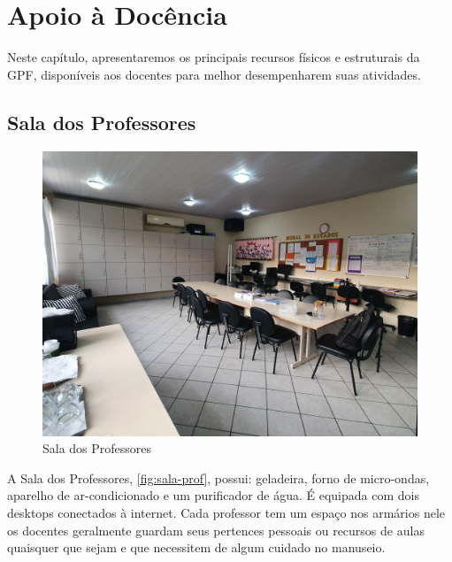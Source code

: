 \chapter{Apoio à Docência} %
\label{chap:Apoio à Docência}
Neste capítulo, apresentaremos os principais recursos físicos e estruturais da \ac{GPF}, disponíveis aos docentes para melhor desempenharem suas atividades.

\section{Sala dos Professores} %
\label{sec:Sala dos Professores}
\setlength\intextsep{0pt}
\begin{figure}
	\centering
	\caption{Sala dos Professores}
	\label{fig:sala-prof}
	\includegraphics[width=.45\textwidth]{assets/sala-prof.jpg}
\end{figure}
A Sala dos Professores, \autoref{fig:sala-prof}, possui: geladeira, forno de micro-ondas, aparelho de ar-condicionado e um purificador de água. É equipada com dois desktops conectados à internet. Cada professor tem um espaço nos armários nele os docentes geralmente guardam seus pertences pessoais ou recursos de aulas quaisquer que sejam e que necessitem de algum cuidado no manuseio. 

